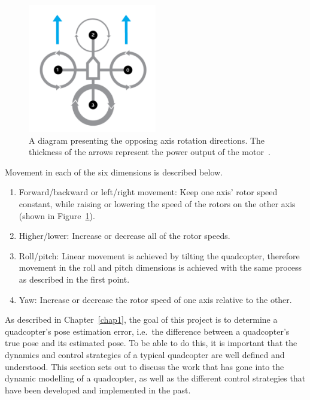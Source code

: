 \begin{figure}
  \centering
  \includegraphics[width=0.5\textwidth]{figures/chapter2/quad_axis.pdf}
  \caption[Diagram presenting the opposing axis rotations directions.]{A diagram presenting the opposing axis rotation directions. The thickness of the arrows represent the power output of the motor~\citep{quad-rotation-pic}.}
\label{fig:chap2-quad-rotation}
\end{figure}

Movement in each of the six dimensions is described below. 

\begin{enumerate}
  \item Forward/backward or left/right movement: Keep one axis' rotor speed constant, while raising or lowering the speed of the rotors on the other axis (shown in Figure~\ref{fig:chap2-quad-rotation}).
  \item Higher/lower: Increase or decrease all of the rotor speeds.
  \item Roll/pitch: Linear movement is achieved by tilting the quadcopter, therefore movement in the roll and pitch dimensions is achieved with the same process as described in the first point. 
  \item Yaw: Increase or decrease the rotor speed of one axis relative to the other. 
\end{enumerate}

As described in Chapter~\ref{chap1}, the goal of this project is to determine a quadcopter's pose estimation error, i.e.\ the difference between a quadcopter's true pose and its estimated pose. To be able to do this, it is important that the dynamics and control strategies of a typical quadcopter are well defined and understood. This section sets out to discuss the work that has gone into the dynamic modelling of a quadcopter, as well as the different control strategies that have been developed and implemented in the past. 

